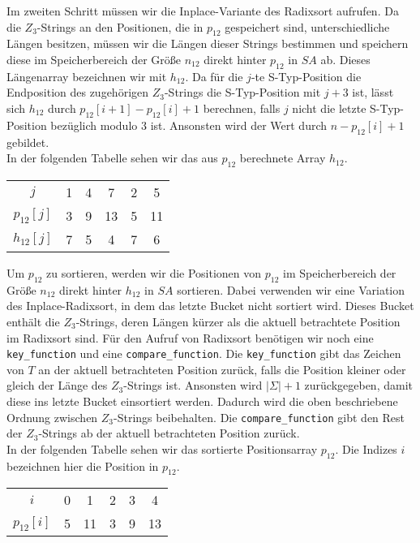 Im zweiten Schritt müssen wir die Inplace-Variante des Radixsort aufrufen. Da die $Z_3$-Strings an den Positionen, die in $p_{12}$ gespeichert sind, unterschiedliche Längen besitzen, müssen wir die Längen dieser Strings bestimmen und speichern diese im Speicherbereich der Größe $n_{12}$ direkt hinter $p_{12}$ in $SA$ ab. Dieses Längenarray bezeichnen wir mit $h_{12}$. Da für die $j$-te S-Typ-Position die Endposition des zugehörigen $Z_3$-Strings die S-Typ-Position mit $j+3$ ist, lässt sich $h_{12}$ durch $p_{12}[i+1]-p_{12}[i]+1$ berechnen, falls $j$ nicht die letzte S-Typ-Position bezüglich modulo $3$ ist. Ansonsten wird der Wert durch $n-p_{12}[i]+1$ gebildet. \\
In der folgenden Tabelle sehen wir das aus $p_{12}$ berechnete Array $h_{12}$.

\begin{table}[H]
	\footnotesize
	\centering
	\begin{tabular}{c| c c c || c c }
		$j$ & 1 & 4 & 7 & 2 & 5 \\
		$p_{12}[j]$ & 3 & 9 & 13 & 5 & 11 \\
		$h_{12}[j]$ & 7 & 5 & 4 & 7 & 6 
	\end{tabular}
\end{table}

Um $p_{12}$ zu sortieren, werden wir die Positionen von $p_{12}$ im Speicherbereich der Größe $n_{12}$ direkt hinter $h_{12}$ in $SA$ sortieren. Dabei verwenden wir eine Variation des Inplace-Radixsort, in dem das letzte Bucket nicht sortiert wird. Dieses Bucket enthält die $Z_3$-Strings, deren Längen kürzer als die aktuell betrachtete Position im Radixsort sind. Für den Aufruf von Radixsort benötigen wir noch eine \texttt{key\_function} und eine \texttt{compare\_function}. Die \texttt{key\_function} gibt das Zeichen von $T$ an der aktuell betrachteten Position zurück, falls die Position kleiner oder gleich der Länge des $Z_3$-Strings ist. Ansonsten wird $|\Sigma| +1$ zurückgegeben, damit diese ins letzte Bucket einsortiert werden. Dadurch wird die oben beschriebene Ordnung zwischen $Z_3$-Strings beibehalten. Die \texttt{compare\_function} gibt den Rest der $Z_3$-Strings ab der aktuell betrachteten Position zurück. \\
In der folgenden Tabelle sehen wir das sortierte Positionsarray $p_{12}$. Die Indizes $i$ bezeichnen hier die Position in $p_{12}$.

\begin{table}[H]
	\footnotesize
	\centering
	\begin{tabular}{c| c c c c c }
		$i$ & 0 & 1 & 2 & 3 & 4 \\
		$p_{12}[i]$ & 5 & 11 & 3 & 9 & 13 
	\end{tabular}
\end{table}

